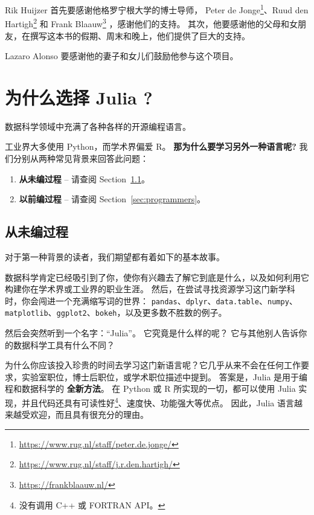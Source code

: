 \documentclass[
  notoc %
]{tufte-book}
\DeclareRobustCommand{\href}[2]{#2\footnote{\url{#1}}}
\newcommand{\passthrough}[1]{#1}
\begin{document}
Rik Huijzer 首先要感谢他格罗宁根大学的博士导师，
\href{https://www.rug.nl/staff/peter.de.jonge/}{Peter de
Jonge}、\href{https://www.rug.nl/staff/j.r.den.hartigh/}{Ruud den
Hartigh} 和 \href{https://frankblaauw.nl/}{Frank Blaauw}
，感谢他们的支持。
其次，他要感谢他的父母和女朋友，在撰写这本书的假期、周末和晚上，他们提供了巨大的支持。

Lazaro Alonso 要感谢他的妻子和女儿们鼓励他参与这个项目。

\hypertarget{sec:why_julia}{%
\chapter{为什么选择 Julia ?}\label{sec:why_julia}}

数据科学领域中充满了各种各样的开源编程语言。

工业界大多使用 Python，而学术界偏爱 R。
\textbf{那为什么要学习另外一种语言呢?}
我们分别从两种常见背景来回答此问题：

\begin{enumerate}
\def\labelenumi{\arabic{enumi}.}
\item
  \textbf{从未编过程} -- 请查阅 Section~\ref{sec:non-programmers}。
\item
  \textbf{以前编过程} -- 请查阅 Section~\ref{sec:programmers}。
\end{enumerate}

\hypertarget{sec:non-programmers}{%
\section{从未编过程}\label{sec:non-programmers}}

对于第一种背景的读者，我们期望都有着如下的基本故事。

数据科学肯定已经吸引到了你，使你有兴趣去了解它到底是什么，以及如何利用它构建你在学术界或工业界的职业生涯。
然后，在尝试寻找资源学习这门新学科时，你会闯进一个充满缩写词的世界：
\passthrough{\lstinline!pandas!}、\passthrough{\lstinline!dplyr!}、\passthrough{\lstinline!data.table!}、\passthrough{\lstinline!numpy!}、\passthrough{\lstinline!matplotlib!}、\passthrough{\lstinline!ggplot2!}、\passthrough{\lstinline!bokeh!}，以及更多数不胜数的例子。

然后会突然听到一个名字：``Julia''。 它究竟是什么样的呢？
它与其他别人告诉你的数据科学工具有什么不同？

为什么你应该投入珍贵的时间去学习这门新语言呢？它几乎从来不会在任何工作要求，实验室职位，博士后职位，或学术职位描述中提到。
答案是，Julia 是用于编程和数据科学的 \textbf{全新方法}。 在 Python 或 R
所实现的一切，都可以使用 Julia
实现，并且代码还具有可读性好\footnote{没有调用 C++ 或 FORTRAN API。}、速度快、功能强大等优点。
因此，Julia 语言越来越受欢迎，而且具有很充分的理由。
\end{document}

